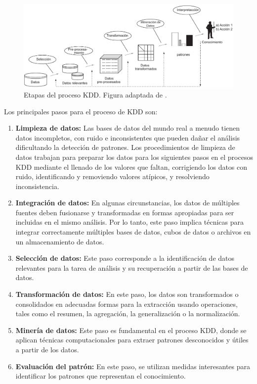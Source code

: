 \begin{figure}[htp]
\centering
\includegraphics[width=0.99\columnwidth]{chapter3/KDD-process.pdf}
\caption{Etapas del proceso KDD. Figura adaptada de \cite{Fayyad:1996:DMK:257938.257942}.}
\label{fig:processoKDD}
\end{figure}


Los principales pasos para el proceso de KDD son:

\begin{enumerate}

    \item \textbf{Limpieza de datos:} Las bases de datos del mundo real a menudo tienen datos incompletos, con ruido e inconsistentes que pueden dañar el análisis dificultando la detección de patrones. Los procedimientos de limpieza de datos trabajan para preparar los datos para los siguientes pasos en el procesos KDD mediante el llenado de los valores que faltan, corrigiendo los datos con ruido, identificando y removiendo valores atípicos, y resolviendo inconsistencia.
    \item \textbf{Integración de datos:} En algunas circunstancias, los datos de múltiples fuentes deben fusionarse y transformadas en formas apropiadas para ser incluidas en el mismo análisis. Por lo tanto, este paso implica técnicas para integrar correctamente múltiples bases de datos, cubos de datos o archivos en un almacenamiento de datos.
    \item \textbf{Selección de datos:} Este paso corresponde a la identificación de datos relevantes para la tarea de análisis y su recuperación a partir de las bases de datos.
    \item \textbf{Transformación de datos:} En este paso, los datos son transformados o consolidados en adecuadas formas para la extracción usando operaciones, tales como el resumen, la agregación, la generalización o la normalización.
    \item \textbf{Minería de datos:} Este paso es fundamental en el proceso KDD, donde se aplican técnicas computacionales para extraer patrones desconocidos y útiles a partir de los datos.
    \item \textbf{Evaluación del patrón:} En este paso, se utilizan medidas interesantes para identificar los patrones que representan el conocimiento.

\end{enumerate}


